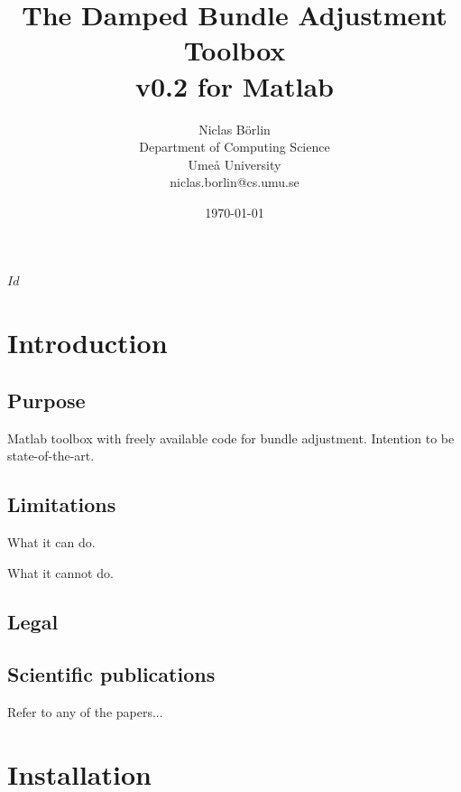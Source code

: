 \documentclass{article}
\begin{document}


\svnInfo $Id$

\newcommand{\dbatversion}{0.2}

\title{The Damped Bundle Adjustment Toolbox\\v\dbatversion{} for Matlab}
\author{Niclas B{\"o}rlin\\Department of Computing Science\\Ume{\aa}
  University\\niclas.borlin@cs.umu.se}
\date{\today}

\maketitle

\newpage

\tableofcontents

\newpage

\section{Introduction}

\subsection{Purpose}

Matlab toolbox with freely available code for bundle adjustment.
Intention to be state-of-the-art.

\subsection{Limitations}

What it can do.

What it cannot do.

\subsection{Legal}



\subsection{Scientific publications}

Refer to any of the papers...

\citet{Borlin2013:Bundle}
\citet{Borlin2013:Experiments}

\section{Installation}
\label{sec:install}
\end{document}
